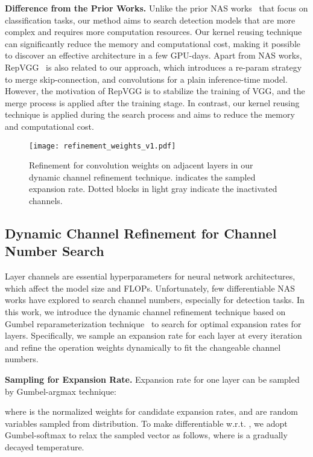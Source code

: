 \documentclass[letterpaper]{article} \usepackage{aaai22}  \usepackage{times}  \usepackage{helvet}  \usepackage{courier}  \usepackage[hyphens]{url}  \usepackage{graphicx} \urlstyle{rm} \def\UrlFont{\rm}  \usepackage{natbib}  \usepackage{caption} \DeclareCaptionStyle{ruled}{labelfont=normalfont,labelsep=colon,strut=off} \frenchspacing  \setlength{\pdfpagewidth}{8.5in}  \setlength{\pdfpageheight}{11in}
\begin{document}
\textbf{Difference from the Prior Works.}
Unlike the prior NAS works~\cite{Stamoulis19,wang2020mergenas} that focus on classification tasks, our method aims to search detection models that are more complex and requires more computation resources. Our kernel reusing technique can significantly reduce the memory and computational cost, making it possible to discover an effective architecture in a few GPU-days.
Apart from NAS works, RepVGG~\cite{repvgg} is also related to our approach, which introduces a re-param strategy to merge skip-connection,  and  convolutions for a plain inference-time model. However, the motivation of RepVGG is to stabilize the training of VGG, and the merge process is applied after the training stage. In contrast, our kernel reusing technique is applied during the search process and aims to reduce the memory and computational cost.


\begin{figure}[tb]
    \centering
\texttt{[image: refinement\_weights\_v1.pdf]}
    \vspace{-8pt}
    \caption{Refinement for convolution weights  on adjacent layers in our dynamic channel refinement technique.  indicates the sampled expansion rate. Dotted blocks in light gray indicate the inactivated channels.}
    \label{fig:refinement_weights}
\end{figure}

\subsection{Dynamic Channel Refinement for Channel Number Search} 
Layer channels are essential hyperparameters for neural network architectures, which affect the model size and FLOPs. Unfortunately, few differentiable NAS works have explored to search channel numbers, especially for detection tasks. In this work, we introduce the dynamic channel refinement technique based on Gumbel reparameterization technique~\cite{gumbel1954statistical} to search for optimal expansion rates for layers. Specifically, we sample an expansion rate for each layer at every iteration and refine the operation weights  dynamically to fit the changeable channel numbers. 

\textbf{Sampling for Expansion Rate.}
Expansion rate for one layer can be sampled by Gumbel-argmax technique:

where  is the normalized weights for candidate expansion rates, and  are random variables sampled from  distribution. To make  differentiable w.r.t. , we adopt Gumbel-softmax to relax the sampled vector as follows, where  is a gradually decayed temperature.
\end{document}
